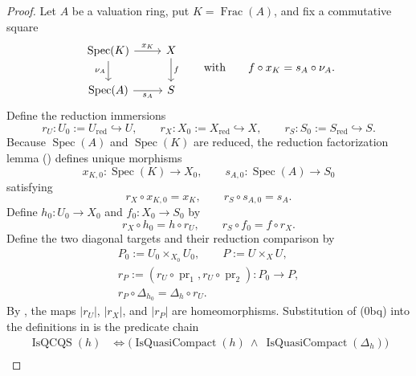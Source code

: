 \begin{proof}
  Let $A$ be a valuation ring, put $K=\operatorname{Frac}(A)$, and fix a
  commutative square
  \[
    \begin{tikzcd}
      \operatorname{Spec}(K) \arrow[r,"x_K"] \arrow[d,"\nu_A"']
        & X \arrow[d,"f"]\\
      \operatorname{Spec}(A) \arrow[r,"s_A"'] & S
    \end{tikzcd}
    \qquad\text{with}\qquad
    f\circ x_K=s_A\circ\nu_A.
  \]
  Define the reduction immersions
  \[
    r_U\colon U_0:=U_{\mathrm{red}}\hookrightarrow U,\qquad
    r_X\colon X_0:=X_{\mathrm{red}}\hookrightarrow X,\qquad
    r_S\colon S_0:=S_{\mathrm{red}}\hookrightarrow S.
  \]
  Because $\operatorname{Spec}(A)$ and $\operatorname{Spec}(K)$ are reduced,
  the reduction factorization lemma
  (\cite[\href{https://stacks.math.columbia.edu/tag/0356}{Tag 0356}]
  {stacks-project}) defines unique morphisms
  \[
    x_{K,0}\colon\operatorname{Spec}(K)\to X_0,\qquad
    s_{A,0}\colon\operatorname{Spec}(A)\to S_0
  \]
  satisfying
  \[
    r_X\circ x_{K,0}=x_K,\qquad r_S\circ s_{A,0}=s_A.             \tag{0a}
  \]
  Define $h_0\colon U_0\to X_0$ and $f_0\colon X_0\to S_0$ by
  \[
    r_X\circ h_0=h\circ r_U,\qquad
    r_S\circ f_0=f\circ r_X.                                    \tag{0b}
  \]
  Define the two diagonal targets and their reduction comparison by
  \[
  \begin{gathered}
    P_0:=U_0\times_{X_0}U_0,
    \qquad P:=U\times_XU,\\
    r_P:=(r_U\circ\operatorname{pr}_1,
      r_U\circ\operatorname{pr}_2)\colon P_0\longrightarrow P,\\
    r_P\circ\Delta_{h_0}=\Delta_h\circ r_U.
  \end{gathered}                                                   \tag{0bq}
  \]
  By , the maps
  $|r_U|$, $|r_X|$, and $|r_P|$ are homeomorphisms.  Substitution of (0bq)
  into the definitions in
   is the predicate chain
  \[
  \begin{aligned}
    \operatorname{IsQCQS}(h)
      &\Longleftrightarrow
        \bigl(
          \operatorname{IsQuasiCompact}(h)\ \wedge\
          \operatorname{IsQuasiCompact}(\Delta_h)
        \bigr)\\

\end{aligned}\]
\end{proof}
